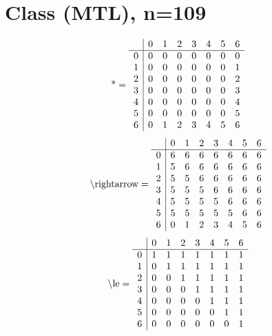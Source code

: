 \documentclass[11pt]{article}
\begin{document}
\section{Class (MTL), n=109}
\[\text{*} = 
\begin{array}{r | r r r r r r r}
 & 0 & 1 & 2 & 3 & 4 & 5 & 6 \\ \hline
0 & 0 & 0 & 0 & 0 & 0 & 0 & 0 \\
1 & 0 & 0 & 0 & 0 & 0 & 0 & 1 \\
2 & 0 & 0 & 0 & 0 & 0 & 0 & 2 \\
3 & 0 & 0 & 0 & 0 & 0 & 0 & 3 \\
4 & 0 & 0 & 0 & 0 & 0 & 0 & 4 \\
5 & 0 & 0 & 0 & 0 & 0 & 0 & 5 \\
6 & 0 & 1 & 2 & 3 & 4 & 5 & 6 \\
\end{array}
\]
\[\text{\textbackslash rightarrow} = 
\begin{array}{r | r r r r r r r}
 & 0 & 1 & 2 & 3 & 4 & 5 & 6 \\ \hline
0 & 6 & 6 & 6 & 6 & 6 & 6 & 6 \\
1 & 5 & 6 & 6 & 6 & 6 & 6 & 6 \\
2 & 5 & 5 & 6 & 6 & 6 & 6 & 6 \\
3 & 5 & 5 & 5 & 6 & 6 & 6 & 6 \\
4 & 5 & 5 & 5 & 5 & 6 & 6 & 6 \\
5 & 5 & 5 & 5 & 5 & 5 & 6 & 6 \\
6 & 0 & 1 & 2 & 3 & 4 & 5 & 6 \\
\end{array}
\]
\[\text{\textbackslash le} = 
\begin{array}{r | r r r r r r r}
 & 0 & 1 & 2 & 3 & 4 & 5 & 6 \\ \hline
0 & 1 & 1 & 1 & 1 & 1 & 1 & 1 \\
1 & 0 & 1 & 1 & 1 & 1 & 1 & 1 \\
2 & 0 & 0 & 1 & 1 & 1 & 1 & 1 \\
3 & 0 & 0 & 0 & 1 & 1 & 1 & 1 \\
4 & 0 & 0 & 0 & 0 & 1 & 1 & 1 \\
5 & 0 & 0 & 0 & 0 & 0 & 1 & 1 \\
6 & 0 & 0 & 0 & 0 & 0 & 0 & 1 \\
\end{array}
\]
\end{document}
